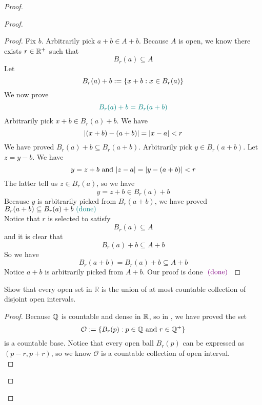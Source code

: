 \documentclass{report}
\begin{document}
\begin{proof}
\begin{proof}
\begin{proof}
Fix $b$. Arbitrarily pick $a+b\in A+b$. Because $A$ is open, we know there exists $r\in\mathbb{R}^+$ such that
\begin{equation}
B_r(a)\subseteq A
\end{equation}
Let
\begin{equation}
B_r(a)+b:=\{ x+b:x\in B_r(a) \}
\end{equation}
We now prove 
\begin{equation}
\textcolor{teal}{B_r(a)+b=B_r(a+b)}
\end{equation}
Arbitrarily pick $x+b\in B_r(a)+b$. We have
\begin{equation}
|(x+b)-(a+b)|=|x-a|<r
\end{equation}
We have proved $B_r(a)+b\subseteq B_r(a+b)$. Arbitrarily pick $y\in B_r(a+b)$. Let $z=y-b$. We have
\begin{equation}
y=z+b\text{ and }|z-a|=|y-(a+b)|<r
\end{equation}
The latter tell us $z \in B_r(a)$, so we have
\begin{equation}
y=z+b \in B_r(a)+b
\end{equation}
Because $y$ is arbitrarily picked from $B_r(a+b)$, we have proved $B_r(a+b)\subseteq B_r(a)+b\textcolor{teal}{\text{ (done) }}$\\

Notice that  $r$ is selected to satisfy
\begin{equation}
B_r(a)\subseteq A
\end{equation}
and it is clear that
\begin{equation}
B_r(a)+b\subseteq A+b
\end{equation}
So we have
\begin{equation}
B_r(a+b)=B_r(a)+b\subseteq A+b
\end{equation}
Notice $a+b$ is arbitrarily picked from $A+b$. Our proof is done  $\textcolor{violet}{\text{ (done) }}$
\end{proof}

\begin{question}{}{}
Show that every open set in \( \mathbb{R} \) is the union of at most countable collection of disjoint open intervals.
\end{question}
\begin{proof}
Because $\mathbb{Q}$ is countable and dense in  $\mathbb{R}$, so in , we have proved the set
\begin{equation}
\mathcal{O}:=\{ B_r(p):p\in\mathbb{Q}\text{ and }r\in\mathbb{Q}^+ \}
\end{equation}
is a countable base. Notice that every open ball $B_r(p)$ can be expressed as $(p-r,p+r)$, so we know $\mathcal{O}$ is a countable collection of open interval.\\


\end{proof}
\end{proof}
\end{proof}
\end{document}

